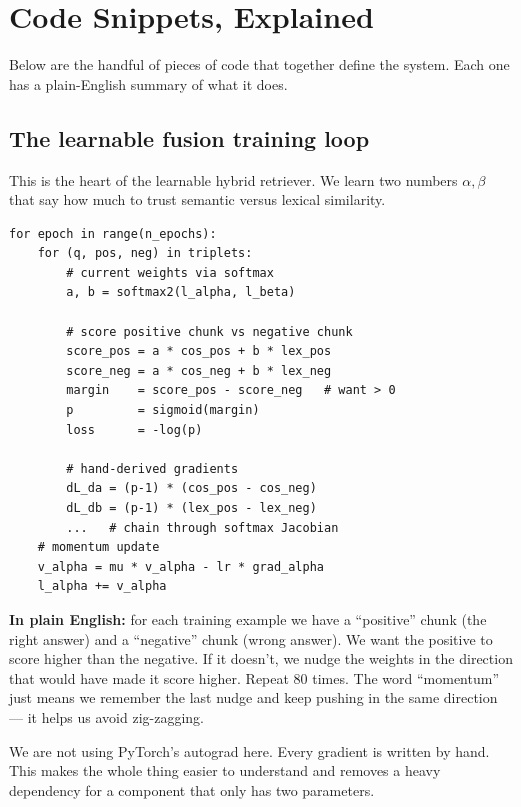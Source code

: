 \documentclass[11pt,a4paper]{article}
\begin{document}
\clearpage
\section{Code Snippets, Explained}
\label{sec:snippets}

Below are the handful of pieces of code that together define the system. Each one has a plain-English summary of what it does.

\subsection{The learnable fusion training loop}

This is the heart of the learnable hybrid retriever. We learn two numbers $\alpha, \beta$ that say how much to trust semantic versus lexical similarity.

\begin{lstlisting}
for epoch in range(n_epochs):
    for (q, pos, neg) in triplets:
        # current weights via softmax
        a, b = softmax2(l_alpha, l_beta)

        # score positive chunk vs negative chunk
        score_pos = a * cos_pos + b * lex_pos
        score_neg = a * cos_neg + b * lex_neg
        margin    = score_pos - score_neg   # want > 0
        p         = sigmoid(margin)
        loss      = -log(p)

        # hand-derived gradients
        dL_da = (p-1) * (cos_pos - cos_neg)
        dL_db = (p-1) * (lex_pos - lex_neg)
        ...   # chain through softmax Jacobian
    # momentum update
    v_alpha = mu * v_alpha - lr * grad_alpha
    l_alpha += v_alpha
\end{lstlisting}

\textbf{In plain English:} for each training example we have a ``positive'' chunk (the right answer) and a ``negative'' chunk (wrong answer). We want the positive to score higher than the negative. If it doesn't, we nudge the weights in the direction that would have made it score higher. Repeat 80 times. The word ``momentum'' just means we remember the last nudge and keep pushing in the same direction --- it helps us avoid zig-zagging.

\begin{keyidea}
We are not using PyTorch's autograd here. Every gradient is written by hand. This makes the whole thing easier to understand and removes a heavy dependency for a component that only has two parameters.
\end{keyidea}
\end{document}
